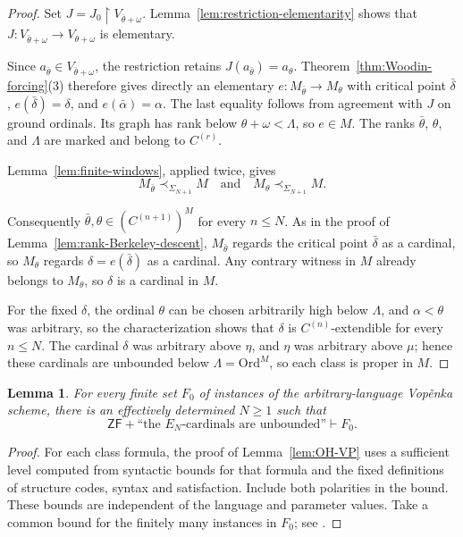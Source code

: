 \documentclass[11pt,a4paper]{amsart}
\newcommand{\ZF}{\mathsf{ZF}}
\newcommand{\Ord}{\mathrm{Ord}}
\newcommand{\restr}{\mathbin{\upharpoonright}}
\theoremstyle{plain}
\newtheorem{lemma}[theorem]{Lemma}
\theoremstyle{definition}
\theoremstyle{remark}
\begin{document}
\begin{proof}
Set $J=J_0\restr V_{\bar\theta+\omega}$.  Lemma~\ref{lem:restriction-elementarity} shows that $J:V_{\bar\theta+\omega}\longrightarrow V_{\theta+\omega}$ is elementary.

Since $a_{\bar\theta}\in V_{\bar\theta+\omega}$, the restriction retains $J(a_{\bar\theta})=a_\theta$.  Theorem~\ref{thm:Woodin-forcing}(3) therefore gives directly an elementary $e:M_{\bar\theta}\to M_\theta$ with critical point $\bar\delta$, $e(\bar\delta)=\delta$, and $e(\bar\alpha)=\alpha$.  The last equality follows from agreement with $J$ on ground ordinals.  Its graph has rank below $\theta+\omega<\Lambda$, so $e\in M$.  The ranks $\bar\theta$, $\theta$, and $\Lambda$ are marked and belong to $C^{(r)}$.

Lemma~\ref{lem:finite-windows}, applied twice, gives
\[
M_{\bar\theta}\prec_{\Sigma_{N+1}}M
\quad\text{and}\quad
M_\theta\prec_{\Sigma_{N+1}}M.
\]

Consequently $\bar\theta,\theta\in(C^{(n+1)})^M$ for every $n\leq N$.  As in the proof of Lemma~\ref{lem:rank-Berkeley-descent}, $M_{\bar\theta}$ regards the critical point $\bar\delta$ as a cardinal, so $M_\theta$ regards $\delta=e(\bar\delta)$ as a cardinal.  Any contrary witness in $M$ already belongs to $M_\theta$, so $\delta$ is a cardinal in $M$.

For the fixed $\delta$, the ordinal $\theta$ can be chosen arbitrarily high below $\Lambda$, and $\alpha<\theta$ was arbitrary, so the characterization shows that $\delta$ is $C^{(n)}$-extendible for every $n\leq N$.  The cardinal $\delta$ was arbitrary above $\eta$, and $\eta$ was arbitrary above $\mu$; hence these cardinals are unbounded below $\Lambda=\Ord^M$, so each class is proper in $M$.
\end{proof}

\begingroup

\begin{lemma}\label{lem:finite-language-reduction}
For every finite set $F_0$ of instances of the arbitrary-language Vop\v{e}nka scheme, there is an effectively determined $N\geq1$ such that
\[
\ZF+\text{``the $E_N$-cardinals are unbounded''}\vdash F_0.
\]
\end{lemma}

\begin{proof}
For each class formula, the proof of Lemma~\ref{lem:OH-VP} uses a sufficient level computed from syntactic bounds for that formula and the fixed definitions of structure codes, syntax and satisfaction.  Include both polarities in the bound.  These bounds are independent of the language and parameter values.  Take a common bound for the finitely many instances in $F_0$; see \cite[Section~2]{Supplement}.
\end{proof}
\endgroup
\end{document}
